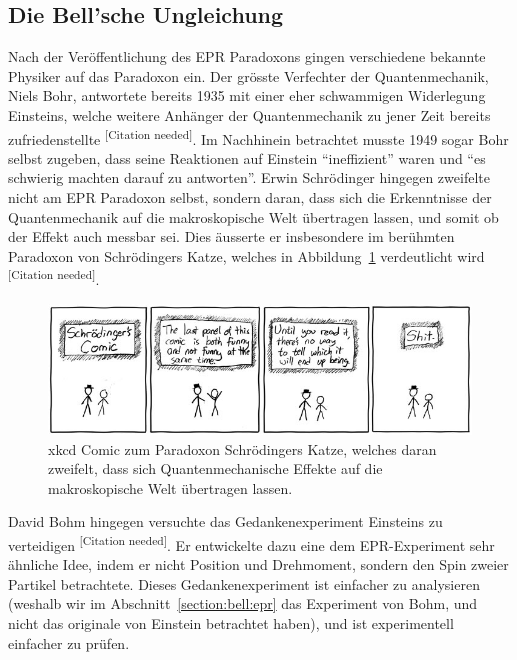 \begin{refsection}
\section{Die Bell'sche Ungleichung\label{section:bell:bell}}
Nach der Ver\"offentlichung des EPR Paradoxons gingen verschiedene bekannte
Physiker auf das Paradoxon ein.
Der gr\"osste Verfechter der Quantenmechanik, Niels Bohr, antwortete bereits
1935 mit einer eher schwammigen Widerlegung Einsteins, welche weitere 
Anh\"anger der Quantenmechanik zu jener Zeit bereits zufriedenstellte
\textsuperscript{[Citation needed]}.
Im Nachhinein betrachtet musste 1949 sogar Bohr selbst zugeben, dass seine
Reaktionen auf Einstein \enquote{ineffizient} waren und 
\enquote{es schwierig machten darauf zu antworten}. 
Erwin Schr\"odinger hingegen zweifelte nicht am EPR Paradoxon selbst, sondern
daran, dass sich die Erkenntnisse der Quantenmechanik auf die makroskopische
Welt \"ubertragen lassen, und somit ob der Effekt auch messbar sei.
Dies \"ausserte er insbesondere im ber\"uhmten Paradoxon von 
Schr\"odingers Katze, welches in Abbildung~\ref{fig:bell:xkcd_schroedinger}
verdeutlicht wird \textsuperscript{[Citation needed]}.

\begin{figure}
    \centering
    \includegraphics[width=0.8\linewidth]{bell/images/xkcd_schroedinger.jpg}
    \caption{xkcd Comic zum Paradoxon Schr\"odingers Katze, welches daran
    zweifelt, dass sich Quantenmechanische Effekte auf die makroskopische
    Welt \"ubertragen lassen. \cite{Bell:XkcdSchroedinger}}
    \label{fig:bell:xkcd_schroedinger}
\end{figure}

David Bohm hingegen versuchte das Gedankenexperiment Einsteins zu verteidigen
\textsuperscript{[Citation needed]}.
Er entwickelte dazu eine dem EPR-Experiment sehr \"ahnliche Idee, indem er
nicht Position und Drehmoment, sondern den Spin zweier Partikel betrachtete.
Dieses Gedankenexperiment ist einfacher zu analysieren (weshalb wir im
Abschnitt~\ref{section:bell:epr} das Experiment von Bohm, und nicht das
originale von Einstein betrachtet haben), und ist experimentell einfacher
zu pr\"ufen.


\end{refsection}
